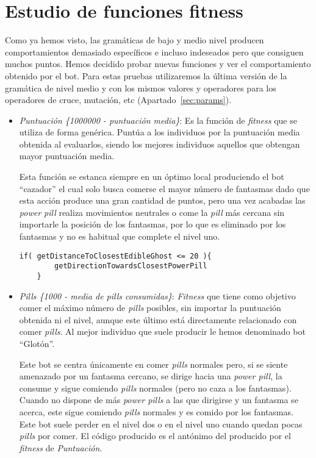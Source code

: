 \section{Estudio de funciones fitness}
Como ya hemos visto, las gramáticas de bajo y medio nivel producen comportamientos demasiado específicos e incluso indeseados pero que consiguen muchos puntos. Hemos decidido probar nuevas funciones y ver el comportamiento obtenido por el bot. Para estas pruebas utilizaremos la última versión de la  gramática de nivel medio y con los mismos valores y operadores para los operadores de cruce, mutación, etc (Apartado~\ref{sec:params}).
\begin{itemize}
\item \textit{Puntuación \{1000000 - puntuación media\}}: Es la función de \textit{fitness} que se utiliza de forma genérica. Puntúa a los individuos por la puntuación media obtenida al evaluarlos, siendo los mejores individuos aquellos que obtengan mayor puntuación media.

Esta función se estanca siempre en un óptimo local produciendo el bot ``cazador'' el cual solo busca comerse el mayor número de fantasmas dado que esta acción produce una gran cantidad de puntos, pero una vez acabadas las \textit{power pill} realiza movimientos neutrales o come la \textit{pill} más cercana sin importarle la posición de los fantasmas, por lo que es eliminado por los fantasmas y no es habitual que complete el nivel uno.

\begin{lstlisting}[caption={Mejor individuo obtenido mediante esta función fitness.}]
    if( getDistanceToClosestEdibleGhost <= 20 ){ 
        getDirectionTowardsClosestPowerPill
    }
\end{lstlisting}

\item \textit{Pills \{1000 - media de pills consumidas\}}: \textit{Fitness} que tiene como objetivo comer el máximo número de \textit{pills} posibles, sin importar la puntuación obtenida ni el nivel, aunque este último está directamente relacionado con comer \textit{pills}. Al mejor individuo que suele producir le hemos denominado bot ``Glotón''.

Este bot se centra únicamente en comer \textit{pills} normales pero, si se siente amenazado por un fantasma cercano, se dirige hacia una \textit{power pill}, la consume y sigue comiendo \textit{pills} normales (pero no caza a los fantasmas). Cuando no dispone de más \textit{power pills} a las que dirigirse y un fantasma se acerca, este sigue comiendo \textit{pills} normales y es comido por los fantasmas. Este bot suele perder en el nivel dos o en el nivel uno cuando quedan pocas \textit{pills} por comer. El código producido es el antónimo del producido por el \textit{fitness} de \textit{Puntuación}.


\end{itemize}
